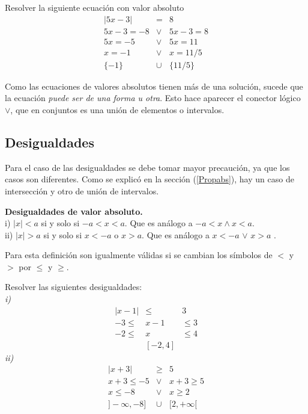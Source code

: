\begin{myexample}
Resolver la siguiente ecuación con valor absoluto
\begin{eqnarray*}
|5x-3|&=&8\\
5x-3=-8 &\vee & 5x-3=8\\
5x=-5 &\vee & 5x=11\\
x=-1 &\vee & x=11/5\\
\{-1\} &\cup & \{11/5\}
\end{eqnarray*}
\end{myexample}
Como las ecuaciones de valores absolutos tienen más de una solución, sucede que la ecuación \textit{puede ser de una forma u otra}. Esto hace aparecer el conector lógico $\vee$, que en conjuntos es una unión de elementos o intervalos.\\

\subsection{Desigualdades}

Para el caso de las desigualdades se debe tomar mayor precaución, ya que los casos son diferentes. Como se explicó en la sección (\ref{Propabs}), hay un caso de intersección y otro de unión de intervalos.\\

\begin{mydef}
\textbf{Desigualdades de valor absoluto.}\\

\noindent i) $|x|<a$ si y solo si $-a<x<a$. Que es análogo a $ -a<x\wedge x<a$.\\
\noindent ii) $|x|>a$ si y solo si $x<-a$ o $x>a$. Que es análogo a $x<-a$ $\vee$ $x>a$ .
\end{mydef}
Para esta definición son igualmente válidas si se cambian los símbolos de $<$ y $>$ por $\leq$ y $\geq$. 

\begin{myexample}
\label{ejemplodosd}
Resolver las siguientes desigualdades:\\

\textit{i)}\\
\begin{eqnarray*}
|x-1|&\leq &  3\\
-3 \leq & x-1 &\leq 3 \\
-2 \leq & x &\leq  4 \\
&[-2,4]&
\end{eqnarray*}
\textit{ii)}\\
\begin{eqnarray*}
|x+3|&\geq & 5 \\
x+3\leq -5 &\vee &x+3\geq 5\\
x\leq -8 &\vee &x\geq 2\\
]-\infty,-8]&\cup & [2,+\infty [
\end{eqnarray*}
\end{myexample}

